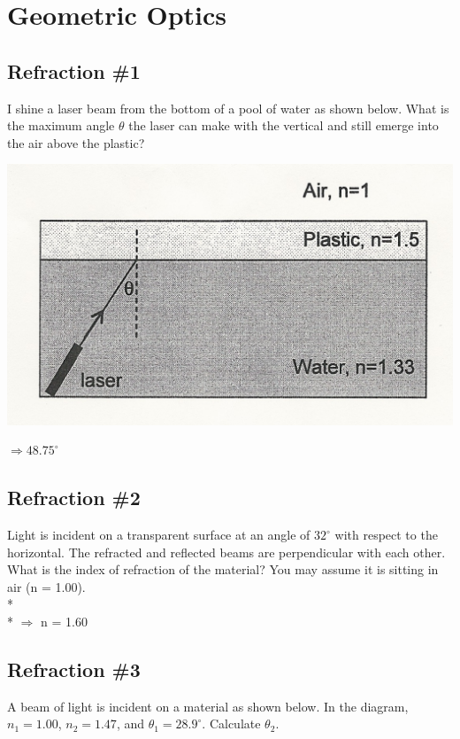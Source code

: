 \documentclass[11pt]{article}
\begin{document}

\pagebreak
\section{Geometric Optics}
\vspace{10pt}

\subsection{Refraction \#1}
I shine a laser beam from the bottom of a pool of water as shown below.  What is the maximum angle $\theta$ the laser can make with the vertical and still emerge into the air above the plastic?

\begin{center}
\includegraphics[scale=0.2]{Images/slab_of_water_and_plastic.jpg}
\end{center}

$\Rightarrow 48.75^\circ$

\subsection{Refraction \#2}
Light is incident on a transparent surface at an angle of $32^\circ$ with respect to the horizontal.  The refracted and reflected beams are perpendicular with each other.  What is the index of refraction of the material?  You may assume it is sitting in air (n = 1.00). \\* \\*
$\Rightarrow$ n = 1.60

\subsection{Refraction \#3}
A beam of light is incident on a material as shown below.  In the diagram, $n_1 = 1.00$, $n_2 = 1.47$, and $\theta_1 = 28.9^\circ$.  Calculate $\theta_2$.
\end{document}
